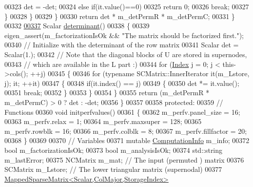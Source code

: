 \begin{DoxyCode}
00323               det = -det;
00324             \textcolor{keywordflow}{else} \textcolor{keywordflow}{if}(it.value()==0)
00325               \textcolor{keywordflow}{return} 0;
00326             \textcolor{keywordflow}{break};
00327           \}
00328         \}
00329       \}
00330       \textcolor{keywordflow}{return} det * m\_detPermR * m\_detPermC;
00331     \}
00332     
\hyperlink{group___sparse_l_u___module_a02d63d242d27211b5c5827f5d4fd99ff}{00337}     Scalar \hyperlink{group___sparse_l_u___module_a02d63d242d27211b5c5827f5d4fd99ff}{determinant}()
00338     \{
00339       eigen\_assert(m\_factorizationIsOk && \textcolor{stringliteral}{"The matrix should be factorized first."});
00340       \textcolor{comment}{// Initialize with the determinant of the row matrix}
00341       Scalar det = Scalar(1.);
00342       \textcolor{comment}{// Note that the diagonal blocks of U are stored in supernodes,}
00343       \textcolor{comment}{// which are available in the  L part :)}
00344       \textcolor{keywordflow}{for} (\hyperlink{namespace_eigen_a62e77e0933482dafde8fe197d9a2cfde}{Index} j = 0; j < this->cols(); ++j)
00345       \{
00346         \textcolor{keywordflow}{for} (\textcolor{keyword}{typename} SCMatrix::InnerIterator it(m\_Lstore, j); it; ++it)
00347         \{
00348           \textcolor{keywordflow}{if}(it.index() == j)
00349           \{
00350             det *= it.value();
00351             \textcolor{keywordflow}{break};
00352           \}
00353         \}
00354       \}
00355       \textcolor{keywordflow}{return} (m\_detPermR * m\_detPermC) > 0 ? det : -det;
00356     \}
00357 
00358   \textcolor{keyword}{protected}:
00359     \textcolor{comment}{// Functions }
00360     \textcolor{keywordtype}{void} initperfvalues()
00361     \{
00362       m\_perfv.panel\_size = 16;
00363       m\_perfv.relax = 1; 
00364       m\_perfv.maxsuper = 128; 
00365       m\_perfv.rowblk = 16; 
00366       m\_perfv.colblk = 8; 
00367       m\_perfv.fillfactor = 20;  
00368     \}
00369       
00370     \textcolor{comment}{// Variables }
00371     \textcolor{keyword}{mutable} \hyperlink{group__enums_ga85fad7b87587764e5cf6b513a9e0ee5e}{ComputationInfo} m\_info;
00372     \textcolor{keywordtype}{bool} m\_factorizationIsOk;
00373     \textcolor{keywordtype}{bool} m\_analysisIsOk;
00374     std::string m\_lastError;
00375     NCMatrix m\_mat; \textcolor{comment}{// The input (permuted ) matrix }
00376     SCMatrix m\_Lstore; \textcolor{comment}{// The lower triangular matrix (supernodal)}
00377     \hyperlink{class_eigen_1_1_mapped_sparse_matrix}{MappedSparseMatrix<Scalar,ColMajor,StorageIndex>} 

\end{DoxyCode}
